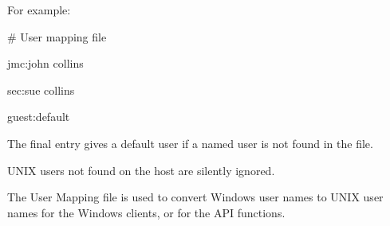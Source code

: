 For example:

\begin{expara}

\# User mapping file

jmc:john collins

sec:sue collins

guest:default

\end{expara}

The final entry gives a default user if a named user is not found in the file.

UNIX users not found on the host are silently ignored.

The User Mapping file is used to convert Windows user names to UNIX user names for the Windows clients, or for the API functions.

